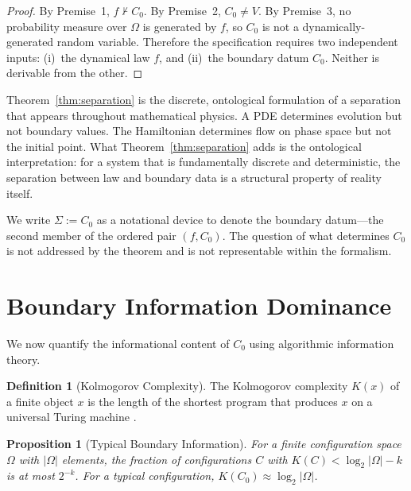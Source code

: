 \documentclass[12pt]{article}
\theoremstyle{plain}
\newtheorem{proposition}[theorem]{Proposition}
\theoremstyle{definition}
\newtheorem{definition}[theorem]{Definition}
\theoremstyle{remark}
\begin{document}
\begin{proof}
By Premise~1, $f \nvdash C_0$. By Premise~2, $C_0 \neq V$. By Premise~3, no probability measure over $\Omega$ is generated by $f$, so $C_0$ is not a dynamically-generated random variable. Therefore the specification requires two independent inputs: (i)~the dynamical law $f$, and (ii)~the boundary datum $C_0$. Neither is derivable from the other.
\end{proof}

Theorem~\ref{thm:separation} is the discrete, ontological formulation of a separation that appears throughout mathematical physics. A PDE determines evolution but not boundary values. The Hamiltonian determines flow on phase space but not the initial point. What Theorem~\ref{thm:separation} adds is the ontological interpretation: for a system that is fundamentally discrete and deterministic, the separation between law and boundary data is a structural property of reality itself.

We write $\Sigma := C_0$ as a notational device to denote the boundary datum---the second member of the ordered pair $(f, C_0)$. The question of what determines $C_0$ is not addressed by the theorem and is not representable within the formalism.


\section{Boundary Information Dominance}

We now quantify the informational content of $C_0$ using algorithmic information theory.

\begin{definition}[Kolmogorov Complexity]\label{def:kolmogorov}
The Kolmogorov complexity $K(x)$ of a finite object $x$ is the length of the shortest program that produces $x$ on a universal Turing machine \cite{kolmogorov1965,li-vitanyi2008}.
\end{definition}

\begin{proposition}[Typical Boundary Information]\label{prop:typical}
For a finite configuration space $\Omega$ with $|\Omega|$ elements, the fraction of configurations $C$ with $K(C) < \log_2|\Omega| - k$ is at most $2^{-k}$. For a typical configuration, $K(C_0) \approx \log_2|\Omega|$.
\end{proposition}
\end{document}
